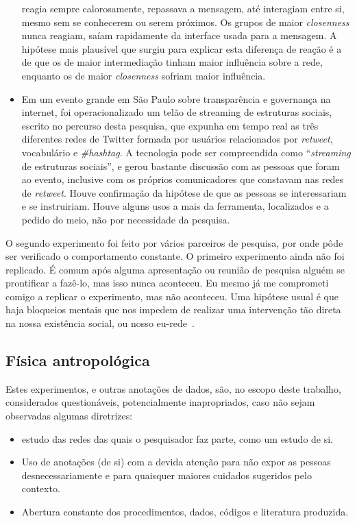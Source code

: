 \documentclass[a4paper,openright,12pt]{report} %
\begin{document}
\begin{itemize}
        reagia sempre calorosamente, repassava a mensagem, até interagiam entre si,
        mesmo sem se conhecerem ou serem próximos.
        Os grupos de maior \emph{closenness} nunca reagiam, saíam rapidamente 
        da interface usada para a mensagem. A hipótese mais plausível que surgiu
        para explicar esta diferença de reação é a de que os de maior intermediação
        tinham maior influência sobre
        a rede, enquanto os de maior \emph{closenness} sofriam maior influência.
    \item Em um evento grande em São Paulo sobre transparência e governança na internet,
        foi operacionalizado um telão de streaming de estruturas sociais, escrito
        no percurso desta pesquisa, que expunha em tempo real as três diferentes redes de Twitter
        formada por usuários relacionados por \emph{retweet}, vocabulário e \emph{\#hashtag}.
        A tecnologia pode ser compreendida como ``\emph{streaming} de estruturas sociais'',
        e gerou bastante discussão com as pessoas que foram ao evento, inclusive
        com os próprios comunicadores que constavam nas redes de \emph{retweet}.
        Houve confirmação da hipótese de que as pessoas se interessariam e se instruiriam.
        Houve alguns usos a mais da ferramenta, localizados e a pedido do meio, não
        por necessidade da pesquisa.
\end{itemize}

O segundo experimento foi feito por vários parceiros de pesquisa,
por onde pôde ser verificado o comportamento constante.
O primeiro experimento ainda não foi replicado.
É comum após alguma apresentação ou reunião de pesquisa
alguém se prontificar a fazê-lo,
mas isso nunca aconteceu. 
Eu mesmo já me comprometi comigo a replicar o experimento,
mas não aconteceu. Uma hipótese usual é que haja bloqueios
mentais que nos impedem de realizar uma intervenção tão direta
na nossa existência social, ou nosso eu-rede~\cite{latour,ciberiun}.

\subsection{Física antropológica}\label{sec:fan}
Estes experimentos, e outras anotações de dados, são, no escopo deste
trabalho, considerados questionáveis, potencialmente inapropriados,
caso não sejam observadas algumas diretrizes:
\begin{itemize}
    \item estudo das redes das quais o pesquisador faz parte, como um estudo de si.
    \item Uso de anotações (de si) com a devida atenção para não expor as pessoas desnecessariamente
        e para quaisquer maiores cuidados sugeridos pelo contexto.
    \item Abertura constante dos procedimentos, dados, códigos e literatura produzida.
\end{itemize}
\end{document}
